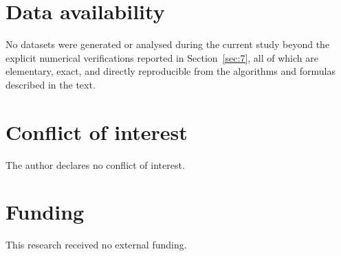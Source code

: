 \documentclass[11pt, a4paper]{article}
\theoremstyle{plain}
\theoremstyle{definition}
\begin{document}
\section*{Data availability}
No datasets were generated or analysed during the current study beyond 
the explicit numerical verifications reported in Section~\ref{sec:7}, all of 
which are elementary, exact, and directly reproducible from the 
algorithms and formulas described in the text.

\section*{Conflict of interest}
The author declares no conflict of interest.

\section*{Funding}
This research received no external funding.
\end{document}
